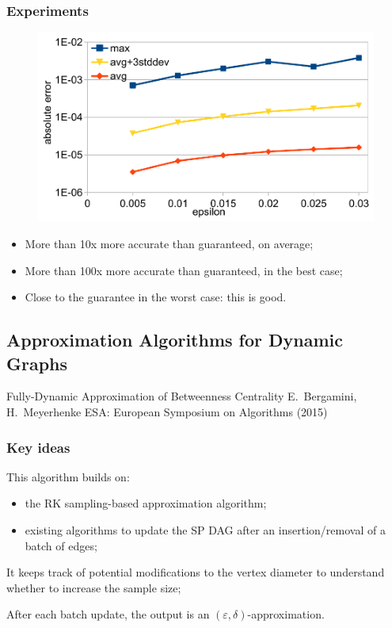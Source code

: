 \begin{frame}
  \frametitle{Experiments}
  \begin{figure}
    \includegraphics[width=\textwidth]{imgs/epinions-error.pdf}
  \end{figure}
  \begin{itemize}
    \item More than 10x more accurate than guaranteed, on average;
    \item More than 100x more accurate than guaranteed, in the best case;
    \item Close to the guarantee in the worst case: this is good.
  \end{itemize}
\end{frame}

\subsection{Approximation Algorithms for Dynamic Graphs}

\begin{frame}
  \centering
  \vfill
  {\huge Fully-Dynamic Approximation of Betweenness Centrality}
  \vfill
  {\Large E.~Bergamini, H.~Meyerhenke}
  \vfill
  {\large ESA: European Symposium on Algorithms (2015)}
  \vfill
\end{frame}

\begin{frame}
  \frametitle{Key ideas}
  This algorithm builds on:
  \begin{itemize}
    \item the RK sampling-based approximation algorithm;
    \item existing algorithms to update the SP DAG after an insertion/removal of
      a batch of edges;
  \end{itemize}
  \pause
  \vfill
  It keeps track of potential modifications to the vertex diameter to
  understand whether to increase the sample size;
  \pause
  \vfill
  \begin{theorem}
    After each batch update, the output is an
    $(\varepsilon,\delta)$-approximation.
  \end{theorem}
\end{frame}

